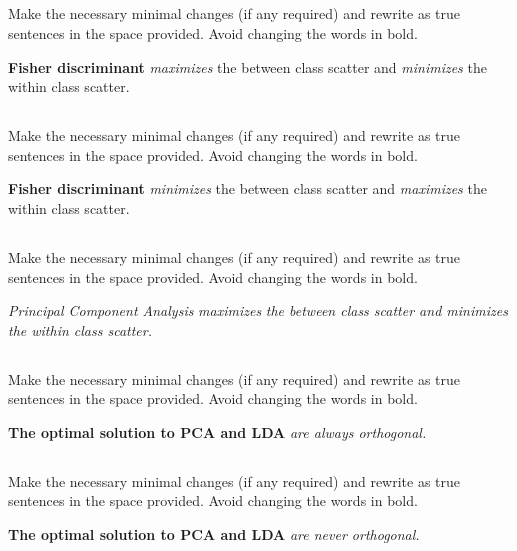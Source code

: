 \begin{frame}
\section{}
Make the necessary minimal changes  (if any required) and rewrite as true sentences in the space provided. Avoid changing the words in bold.

{\bf Fisher discriminant} {\em maximizes} the between class scatter and {\em minimizes} the within class scatter.

\end{frame}


\begin{frame}
\section{}
Make the necessary minimal changes  (if any required) and rewrite as true sentences in the space provided. Avoid changing the words in bold.

{\bf Fisher discriminant} {\em minimizes} the between class scatter and {\em maximizes} the within class scatter.

\end{frame}


\begin{frame}
\section{}
Make the necessary minimal changes  (if any required) and rewrite as true sentences in the space provided. Avoid changing the words in bold.

{\em Principal Component Analysis} {\em maximizes} {\em the between class scatter and minimizes the within class scatter.}

\end{frame}


\begin{frame}
\section{}
Make the necessary minimal changes  (if any required) and rewrite as true sentences in the space provided. Avoid changing the words in bold.

{\bf The optimal solution to PCA and LDA} {\em are always orthogonal.}
\end{frame}


\begin{frame}
\section{}
Make the necessary minimal changes  (if any required) and rewrite as true sentences in the space provided. Avoid changing the words in bold.

{\bf The optimal solution to PCA and LDA} {\em are never orthogonal.}
\end{frame}
